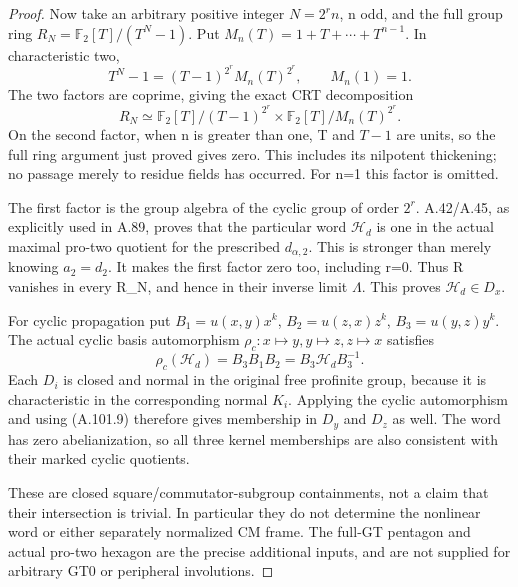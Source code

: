 \begin{proof}
Now take an arbitrary positive integer \(N=2^r n\), n odd, and
the full group ring \(R_N=\mathbb F_2[T]/(T^N-1)\). Put
\(M_n(T)=1+T+\cdots+T^{n-1}\). In characteristic two,
\[
 T^N-1=(T-1)^{2^r}M_n(T)^{2^r},\qquad M_n(1)=1.
 \tag{A.101.7}
\]
The two factors are coprime, giving the exact CRT decomposition
\[
 R_N\simeq\mathbb F_2[T]/(T-1)^{2^r}
       \times\mathbb F_2[T]/M_n(T)^{2^r}.
 \tag{A.101.8}
\]
On the second factor, when n is greater than one, T and \(T-1\) are
units, so the full ring argument just proved gives zero. This
includes its nilpotent thickening; no passage merely to residue
fields has occurred. For n=1 this factor is omitted.

The first factor is the group algebra of the cyclic group of order
\(2^r\). A.42/A.45, as explicitly used in A.89, proves that the
particular word \(\mathcal H_d\) is one in the actual maximal
pro-two quotient for the prescribed \(d_{\alpha,2}\). This is
stronger than merely knowing \(a_2=d_2\). It makes the first
factor zero too, including r=0. Thus R vanishes in every R_N,
and hence in their inverse limit \(\Lambda\). This proves
\(\mathcal H_d\in D_x\).

For cyclic propagation put
\(B_1=u(x,y)x^k\), \(B_2=u(z,x)z^k\),
\(B_3=u(y,z)y^k\). The actual cyclic basis automorphism
\(\rho_c:x\mapsto y,y\mapsto z,z\mapsto x\) satisfies
\[
 \rho_c(\mathcal H_d)=B_3B_1B_2
                       =B_3\mathcal H_dB_3^{-1}.
 \tag{A.101.9}
\]
Each \(D_i\) is closed and normal in the original free profinite group,
because it is characteristic in the corresponding normal \(K_i\).
Applying the cyclic automorphism and using (A.101.9) therefore
gives membership in \(D_y\) and \(D_z\) as well. The word has zero
abelianization, so all three kernel memberships are also consistent
with their marked cyclic quotients.

These are closed square/commutator-subgroup containments, not a
claim that their intersection is trivial. In particular they do
not determine the nonlinear word or either separately normalized
CM frame. The full-GT pentagon and actual pro-two hexagon are the
precise additional inputs, and are not supplied for arbitrary GT0
or peripheral involutions.
\end{proof}
